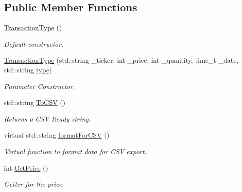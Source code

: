 \subsection*{Public Member Functions}
\begin{DoxyCompactItemize}
\item 
\mbox{\hyperlink{class_transaction_type_af74ebcedbda4d46f90de333b9268b8a8}{Transaction\+Type}} ()
\begin{DoxyCompactList}\small\item\em Default constructor. \end{DoxyCompactList}\item 
\mbox{\hyperlink{class_transaction_type_a2a4110fc15fd45019d84e42b0fee304b}{Transaction\+Type}} (std\+::string \+\_\+ticker, int \+\_\+price, int \+\_\+quantity, time\+\_\+t \+\_\+date, std\+::string \mbox{\hyperlink{class_transaction_type_a8052c2576840eba8072c008022f38d51}{type}})
\begin{DoxyCompactList}\small\item\em Parameter Constructor. \end{DoxyCompactList}\item 
\mbox{\label{class_transaction_type_ae93afca932014b0dfa4d1a3a66ca0ad2}} 
std\+::string \mbox{\hyperlink{class_transaction_type_ae93afca932014b0dfa4d1a3a66ca0ad2}{To\+C\+SV}} ()
\begin{DoxyCompactList}\small\item\em Returns a C\+SV Ready string. \end{DoxyCompactList}\item 
\mbox{\label{class_transaction_type_a49908846fcb07d3f9bef51758c79b370}} 
virtual std\+::string \mbox{\hyperlink{class_transaction_type_a49908846fcb07d3f9bef51758c79b370}{format\+For\+C\+SV}} ()
\begin{DoxyCompactList}\small\item\em Virtual function to format data for C\+SV export. \end{DoxyCompactList}\item 
int \mbox{\hyperlink{class_transaction_type_ac139f76c5ae460bd9c1c87570c6bee34}{Get\+Price}} ()
\begin{DoxyCompactList}\small\item\em Getter for the price. \end{DoxyCompactList}\item 
\mbox{\label{class_transaction_type_a541773963f8beb21a153508f5d221496}} 

\end{DoxyCompactItemize}
